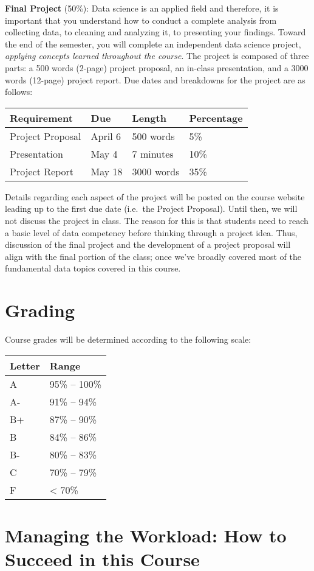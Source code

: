 \documentclass[
  12pt,
]{article}
\begin{document}
\textbf{Final Project} (50\%): Data science is an applied field and
therefore, it is important that you understand how to conduct a complete
analysis from collecting data, to cleaning and analyzing it, to
presenting your findings. Toward the end of the semester, you will
complete an independent data science project, \emph{applying concepts
learned throughout the course}. The project is composed of three parts:
a 500 words (2-page) project proposal, an in-class presentation, and a
3000 words (12-page) project report. Due dates and breakdowns for the
project are as follows:

\begin{longtable}[]{@{}llll@{}}
\toprule
\textbf{Requirement} & \textbf{Due} & \textbf{Length} &
\textbf{Percentage}\tabularnewline
\midrule
\endhead
Project Proposal & April 6 & 500 words & 5\%\tabularnewline
Presentation & May 4 & 7 minutes & 10\%\tabularnewline
Project Report & May 18 & 3000 words & 35\%\tabularnewline
\bottomrule
\end{longtable}

Details regarding each aspect of the project will be posted on the
course website leading up to the first due date (i.e.~the Project
Proposal). Until then, we will not discuss the project in class. The
reason for this is that students need to reach a basic level of data
competency before thinking through a project idea. Thus, discussion of
the final project and the development of a project proposal will align
with the final portion of the class; once we've broadly covered most of
the fundamental data topics covered in this course.

\hypertarget{grading}{%
\section{Grading}\label{grading}}

Course grades will be determined according to the following scale:

\begin{longtable}[]{@{}ll@{}}
\toprule
Letter & Range\tabularnewline
\midrule
\endhead
A & 95\% -- 100\%\tabularnewline
A- & 91\% -- 94\%\tabularnewline
B+ & 87\% -- 90\%\tabularnewline
B & 84\% -- 86\%\tabularnewline
B- & 80\% -- 83\%\tabularnewline
C & 70\% -- 79\%\tabularnewline
F & \textless{} 70\%\tabularnewline
\bottomrule
\end{longtable}

\hypertarget{managing-the-workload-how-to-succeed-in-this-course}{%
\section{Managing the Workload: How to Succeed in this
Course}\label{managing-the-workload-how-to-succeed-in-this-course}}
\end{document}
